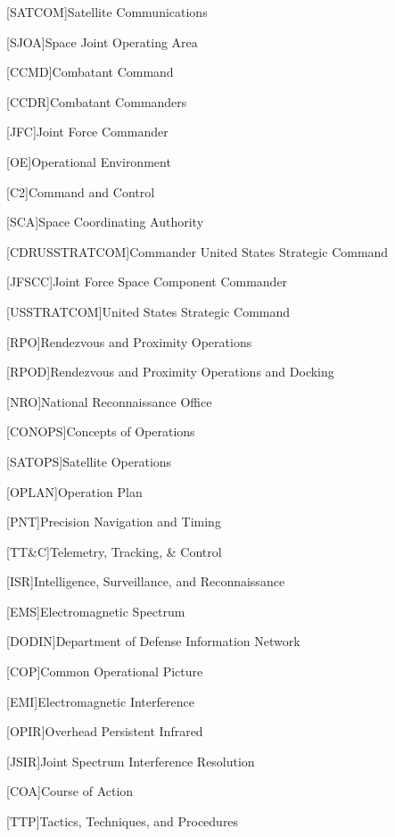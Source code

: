 [SATCOM]{Satellite Communications}

[SJOA]{Space Joint Operating Area}

[CCMD]{Combatant Command}

[CCDR]{Combatant Commanders}

[JFC]{Joint Force Commander}

[OE]{Operational Environment}

[C2]{Command and Control}

[SCA]{Space Coordinating Authority}

[CDRUSSTRATCOM]{Commander United States Strategic Command}

[JFSCC]{Joint Force Space Component Commander}

[USSTRATCOM]{United States Strategic Command}

[RPO]{Rendezvous and Proximity Operations}

[RPOD]{Rendezvous and Proximity Operations and Docking}

[NRO]{National Reconnaissance Office}

[CONOPS]{Concepts of Operations}

[SATOPS]{Satellite Operations}

[OPLAN]{Operation Plan}

[PNT]{Precision Navigation and Timing}

[TT\&C]{Telemetry, Tracking, \& Control}

[ISR]{Intelligence, Surveillance, and Reconnaissance}

[EMS]{Electromagnetic Spectrum}

[DODIN]{Department of Defense Information Network}

[COP]{Common Operational Picture}

[EMI]{Electromagnetic Interference}

[OPIR]{Overhead Persistent Infrared}

[JSIR]{Joint Spectrum Interference Resolution}

[COA]{Course of Action}

[TTP]{Tactics, Techniques, and Procedures}

